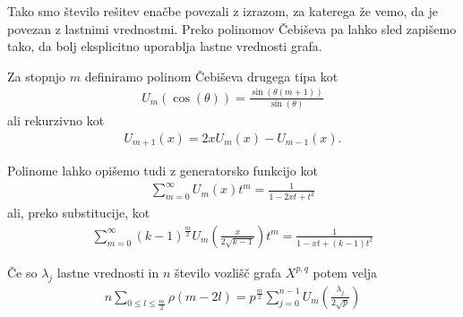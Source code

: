 Tako smo število rešitev enačbe povezali z izrazom, za katerega že vemo, da je povezan z lastnimi vrednostmi. Preko polinomov Čebiševa pa lahko sled zapišemo tako, da bolj eksplicitno uporablja lastne vrednosti grafa.
\begin{definicija}
    Za stopnjo \(m\) definiramo polinom Čebiševa drugega tipa kot 
    \begin{align*}
        U_m(\cos(\theta)) = \frac{\sin(\theta(m+1))}{\sin(\theta)}
    \end{align*}
    ali rekurzivno kot
    \begin{align*}
        U_{m+1}(x) = 2xU_m(x) - U_{m-1}(x).
    \end{align*}
\end{definicija}
Polinome lahko opišemo tudi z generatorsko funkcijo kot
\begin{align*}
    \sum_{m=0}^{\infty} U_m(x)t^m = \frac{1}{1-2xt+t^2}
\end{align*}
ali, preko substitucije, kot
\begin{align*}
    \sum_{m=0}^{\infty} (k-1)^{\frac{m}{2}}U_m\left(\frac{x}{2\sqrt{k-1}}\right)t^m = \frac{1}{1-xt+(k-1)t^2}
\end{align*}

\begin{izrek}
    Če so \(\lambda_j\) lastne vrednosti in \(n\) število vozlišč grafa \(X^{p,q}\) potem velja
    \begin{align*}
        n\sum_{0\leq l \leq \frac{m}{2}} \rho(m-2l) = p^{\frac{m}{2}}\sum_{j=0}^{n-1} U_m \left(\frac{\lambda_j}{2\sqrt{p}}\right)
    \end{align*}
\end{izrek}

